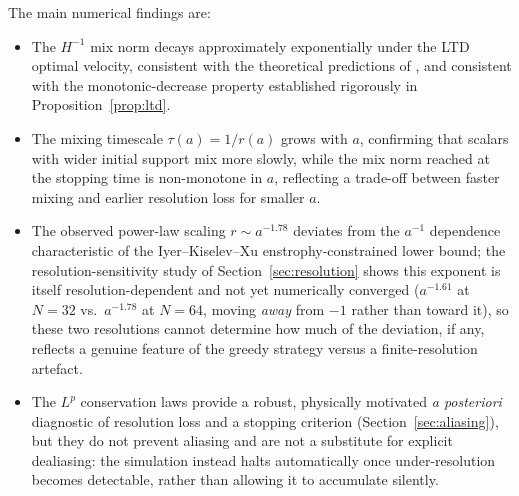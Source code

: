 \documentclass[12pt,a4paper]{article}
\theoremstyle{definition}
\theoremstyle{plain}
\begin{document}
The main numerical findings are:
\begin{itemize}
  \item The $H^{-1}$ mix norm decays approximately exponentially under the
        LTD optimal velocity, consistent with the theoretical predictions of
        \cite{LTD2011}, and consistent with the monotonic-decrease property
        established rigorously in Proposition~\ref{prop:ltd}.
  \item The mixing timescale $\tau(a) = 1/r(a)$ grows with $a$,
        confirming that scalars with wider initial support mix more slowly,
        while the mix norm reached at the stopping time is non-monotone in
        $a$, reflecting a trade-off between faster mixing and earlier
        resolution loss for smaller $a$.
  \item The observed power-law scaling $r\sim a^{-1.78}$ deviates from the
        $a^{-1}$ dependence characteristic of the Iyer--Kiselev--Xu
        enstrophy-constrained lower bound; the resolution-sensitivity
        study of Section~\ref{sec:resolution} shows this exponent is
        itself resolution-dependent and not yet numerically converged
        ($a^{-1.61}$ at $N=32$ vs.\ $a^{-1.78}$ at $N=64$, moving
        \emph{away} from $-1$ rather than toward it), so these two
        resolutions cannot determine how much of the deviation, if any,
        reflects a genuine feature of the greedy strategy versus a
        finite-resolution artefact.
  \item The $L^p$ conservation laws provide a robust, physically motivated
        \emph{a posteriori} diagnostic of resolution loss and a stopping
        criterion (Section~\ref{sec:aliasing}), but they do not prevent
        aliasing and are not a substitute for explicit dealiasing: the
        simulation instead halts automatically once under-resolution
        becomes detectable, rather than allowing it to accumulate
        silently.
\end{itemize}
\end{document}
